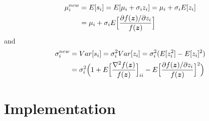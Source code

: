 \begin{equation}
\begin{split}
\mu_{i}^{new} &= E[s_{i}] = E[\mu_{i} + \sigma_{i}z_{i}] = \mu_{i} + \sigma_{i}E[z_{i}] \\ 
&= \mu_{i} + \sigma_{i}E\Big{[}\frac{\partial f(\bm{z}) / \partial z_{i}}{f(\bm{z})}\Big{]}
\end{split}
\end{equation}
and
\begin{equation}
\begin{split}
\sigma_{i}^{new} &= Var[s_{i}] = \sigma_{i}^{2}Var[z_{i}] = \sigma_{i}^{2}(E[z_{i}^{2}] - E[z_{i}]^{2}) \\
&= \sigma_{i}^{2}\Big{(}1 + E\Big{[}\frac{\nabla^{2} f(\bm{z})}{f(\bm{z})}\Big{]}_{ii} - E\Big{[}\frac{\partial f(\bm{z}) / \partial z_{i}}{f(\bm{z})}\Big{]}^{2}\Big{)}
\end{split}
\end{equation}

\section{Implementation}\label{Sec: imp}